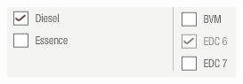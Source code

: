 \begin{figure}[!hts]
\centering
\includegraphics[scale=0.5]{figures/configuratorRenault.png}
\vspace*{-2mm}
\end{figure}









